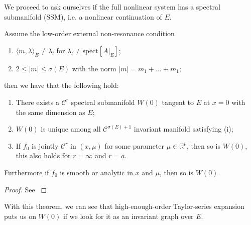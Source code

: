 We proceed to ask ourselves if the full nonlinear system has a spectral submanifold (SSM), i.e. a nonlinear continuation of $E$.

\begin{theorem}[]
Assume the low-order external non-resonance condition
\begin{enumerate}
	\item $\langle m, \lambda \rangle_{E} \neq \lambda _l$ for $\lambda_l \neq  \textrm{spect}[A|_{E}] $;
	\item $2 \leq |m| \leq \sigma(E)$ with the norm $|m | =m_1 + \ldots + m_1$;
\end{enumerate}
then we have that the following hold:
\begin{enumerate}
	\item There exists a $\mathcal{C}^{r}$ spectral submanifold $W(0)$ tangent to $E$ at $x=0$ with the same dimension as $E$;
	\item $W(0)$ is unique among all $\mathcal{C}^{\sigma(E) + 1}$ invariant manifold satisfying (i);
	\item If $f_0$ is jointly $\mathcal{C}^{r}$ in $(x,\mu )$ for some parameter $\mu \in \mathbb{R}^{p}$, then so is $W(0)$, this also holds for $r=\infty $ and $r=a$. 
\end{enumerate}
Furthermore if $f_0$ is smooth or analytic in  $x$ and $\mu $, then so is $W(0)$.
\end{theorem}
\begin{proof}
	See \cite{Ponsioen2016}
\end{proof}
With this theorem, we can see that high-enough-order Taylor-series expansion puts us on $W(0)$ if we look for it as an invariant graph over $E$.

